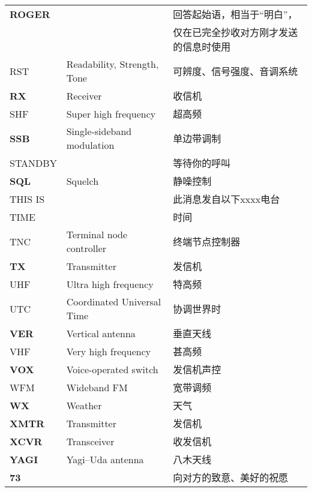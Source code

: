 \begin{longtable}[l]{lll}
  \textbf{ROGER} &                                      & 回答起始语，相当于“明白”，      \\
                 &                                      & 仅在已完全抄收对方刚才发送的信息时使用 \\
  RST            & Readability, Strength, Tone          & 可辨度、信号强度、音调系统       \\
  \textbf{RX}    & Receiver                             & 收信机                 \\
  SHF            & Super high frequency                 & 超高频                 \\
  \textbf{SSB}   & Single-sideband modulation           & 单边带调制               \\
  STANDBY        &                                      & 等待你的呼叫              \\
  \textbf{SQL}   & Squelch                              & 静噪控制                \\
  THIS IS        &                                      & 此消息发自以下xxxx电台       \\
  TIME           &                                      & 时间                  \\
  TNC            & Terminal node controller             & 终端节点控制器             \\
  \textbf{TX}    & Transmitter                          & 发信机                 \\
  UHF            & Ultra high frequency                 & 特高频                 \\
  UTC            & Coordinated Universal Time           & 协调世界时               \\
  \textbf{VER}   & Vertical antenna                     & 垂直天线                \\
  VHF            & Very high frequency                  & 甚高频                 \\
  \textbf{VOX}   & Voice-operated switch                & 发信机声控               \\
  WFM            & Wideband FM                          & 宽带调频                \\
  \textbf{WX}    & Weather                              & 天气                  \\
  \textbf{XMTR}  & Transmitter                          & 发信机                 \\
  \textbf{XCVR}  & Transceiver                          & 收发信机                \\
  \textbf{YAGI}  & Yagi–Uda antenna                     & 八木天线                \\
  \textbf{73}    &                                      & 向对方的致意、美好的祝愿        \\
\end{longtable}

